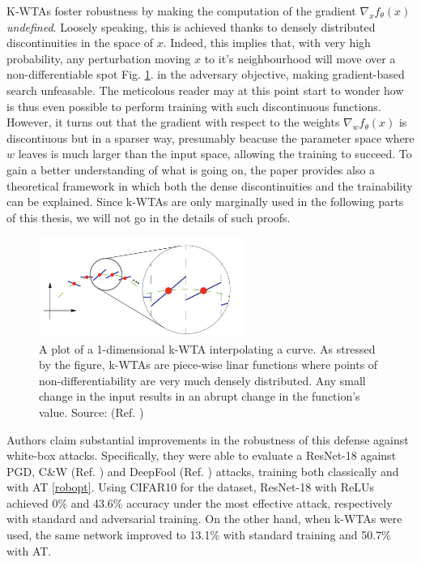 \documentclass[LaM,binding=0.6cm]{./packages/sapthesis/sapthesis}
\begin{document}
    K-WTAs foster robustness by making the computation of the gradient $\nabla_x f_{\theta}(x)$ \textit{undefined}.
    Loosely speaking, this is achieved thanks to densely distributed discontinuities in the space of $x$. Indeed, this implies that,
    with very high probability, any perturbation moving $x$ to it's neighbourhood will move over a non-differentiable spot Fig. \ref{fig:kwta}.
    in the adversary objective, making gradient-based search unfeasable. The meticolous reader may at this point start to wonder
    how is thus even possible to perform training with such discontinuous functions. However, it turns out that the gradient 
    with respect to the weights $\nabla_w f_{\theta}(x)$ is discontiuous but in a sparser way, presumably beacuse the parameter 
    space where $w$ leaves is much larger than the input space, allowing the training to succeed. To gain a better understanding
    of what is going on, the paper provides also a theoretical framework in which both the dense discontinuities and the trainability 
    can be explained. Since k-WTAs are only marginally used in the following parts of this thesis, we will not go in the details
    of such proofs.

    \begin{figure}[h]
        \centering
        \includegraphics[width=0.6\textwidth]{kwta}
        \caption{A plot of a 1-dimensional k-WTA interpolating a curve. As stressed by the figure, k-WTAs are piece-wise linar functions where points of non-differentiability are 
        very much densely distributed. Any small change in the input results in an abrupt change in the function's value. Source: (Ref. )}
        \label{fig:kwta}
    \end{figure}
    
    Authors claim substantial improvements in the robustness of this defense against white-box attacks. Specifically, they were 
    able to evaluate a ResNet-18 against PGD, C\&W (Ref. ) and DeepFool (Ref. ) attacks, training both classically and with AT \ref{robopt}.
    Using CIFAR10 for the dataset, ResNet-18 with ReLUs achieved 0\% and 43.6\% accuracy under the most effective attack,
    respectively with standard and adversarial training. On the other hand, when k-WTAs were used, the same network improved to
    13.1\% with standard training and 50.7\% with AT.
\end{document}
